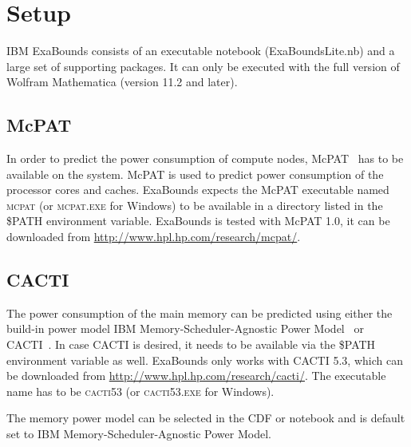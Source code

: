 \section{Setup}
\label{sec:100:setup}

IBM ExaBounds consists of an executable notebook (ExaBoundsLite.nb) and a large set of supporting packages. It can only be executed with the full version of Wolfram Mathematica (version 11.2 and later).

\subsection{McPAT}

In order to predict the power consumption of compute nodes, McPAT~\cite{Li2009} has to be available on the system. McPAT is used to predict power consumption of the processor cores and caches. ExaBounds expects the McPAT executable named \textsc{mcpat} (or \textsc{mcpat.exe} for Windows) to be available in a directory listed in the \textsc{\$PATH} environment variable. ExaBounds is tested with McPAT 1.0, it can be downloaded from \url{http://www.hpl.hp.com/research/mcpat/}.

\subsection{CACTI}

The power consumption of the main memory can be predicted using either the build-in power model IBM Memory-Scheduler-Agnostic Power Model~\cite{Poddar2017} or CACTI~\cite{Thoziyoor2008}. In case CACTI is desired, it needs to be available via the \textsc{\$PATH} environment variable as well. ExaBounds only works with CACTI 5.3, which can be downloaded from \url{http://www.hpl.hp.com/research/cacti/}. The executable name has to be \textsc{cacti53} (or \textsc{cacti53.exe} for Windows).

The memory power model can be selected in the CDF or notebook and is default set to IBM Memory-Scheduler-Agnostic Power Model.

